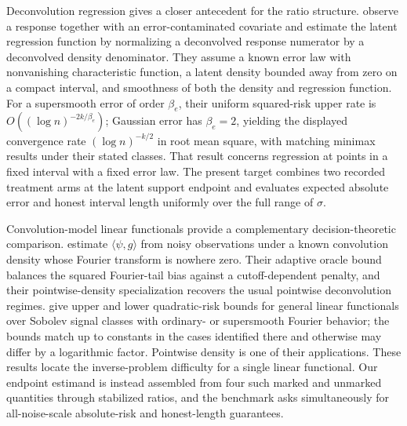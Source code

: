 \documentclass[11pt]{article}
\begin{document}
Deconvolution regression gives a closer antecedent for the ratio structure. \citet[Section~2, Theorems~2 and 5--6]{Fan1993} observe a response together with an error-contaminated covariate and estimate the latent regression function by normalizing a deconvolved response numerator by a deconvolved density denominator. They assume a known error law with nonvanishing characteristic function, a latent density bounded away from zero on a compact interval, and smoothness of both the density and regression function. For a supersmooth error of order \(\beta_e\), their uniform squared-risk upper rate is \(O((\log n)^{-2k/\beta_e})\); Gaussian error has \(\beta_e=2\), yielding the displayed convergence rate \((\log n)^{-k/2}\) in root mean square, with matching minimax results under their stated classes. That result concerns regression at points in a fixed interval with a fixed error law. The present target combines two recorded treatment arms at the latent support endpoint and evaluates expected absolute error and honest interval length uniformly over the full range of \(\sigma\).

Convolution-model linear functionals provide a complementary decision-theoretic comparison. \citet[Theorem~3.1 and Section~4.1]{Butucea2009} estimate \(\langle\psi,g\rangle\) from noisy observations under a known convolution density whose Fourier transform is nowhere zero. Their adaptive oracle bound balances the squared Fourier-tail bias against a cutoff-dependent penalty, and their pointwise-density specialization recovers the usual pointwise deconvolution regimes. \citet[Theorems~1--2 and Section~2.5]{Pensky2017} give upper and lower quadratic-risk bounds for general linear functionals over Sobolev signal classes with ordinary- or supersmooth Fourier behavior; the bounds match up to constants in the cases identified there and otherwise may differ by a logarithmic factor. Pointwise density is one of their applications. These results locate the inverse-problem difficulty for a single linear functional. Our endpoint estimand is instead assembled from four such marked and unmarked quantities through stabilized ratios, and the benchmark asks simultaneously for all-noise-scale absolute-risk and honest-length guarantees.
\end{document}
